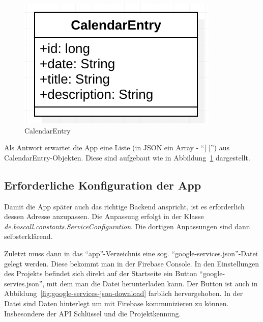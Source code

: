 \begin{figure}[h]
	\centering
	\includegraphics{include/img/calendarentry}
	\caption{CalendarEntry}
	\label{fig:calendarEntry}
\end{figure}
Als Antwort erwartet die App eine Liste (in JSON ein Array - \enquote{[ ]}) aus CalendarEntry-Objekten. Diese sind aufgebaut wie in Abbildung~\ref{fig:calendarEntry} dargestellt.

\subsection{Erforderliche Konfiguration der App}
Damit die App später auch das richtige Backend anspricht, ist es erforderlich dessen Adresse anzupassen. Die Anpassung erfolgt in der Klasse\\ \textit{de.boscall.constants.ServiceConfiguration}. Die dortigen Anpassungen sind dann selbsterklärend.

Zuletzt muss dann in das \enquote{app}-Verzeichnis eine sog. \enquote{google-services.json}-Datei gelegt werden. Diese bekommt man in der Firebase Console. In den Einstellungen des Projekts befindet sich direkt auf der Startseite ein Button \enquote{google-servies.json}, mit dem man die Datei herunterladen kann. Der Button ist auch in Abbildung~\ref{fig:google-services-json-download} farblich hervorgehoben. In der Datei sind Daten hinterlegt um mit Firebase kommunizieren zu können. Insbesondere der API Schlüssel und die Projektkennung.